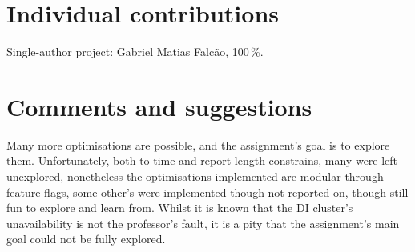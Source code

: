 \documentclass[sigconf]{acmart}
\begin{document}
\section*{Individual contributions}
Single-author project: Gabriel Matias Falcão, 100\,\%.

\section*{Comments and suggestions}

Many more optimisations are possible, and the assignment's goal is to explore
them. Unfortunately, both to time and report length constrains, many were left
unexplored, nonetheless the optimisations implemented are modular through
feature flags, some other's were implemented though not reported on, though
still fun to explore and learn from. Whilst it is known that the DI cluster's
unavailability is not the professor's fault, it is a pity that the assignment's
main goal could not be fully explored.

\printglossary[type=\acronymtype,title={Acronyms}]
\end{document}
